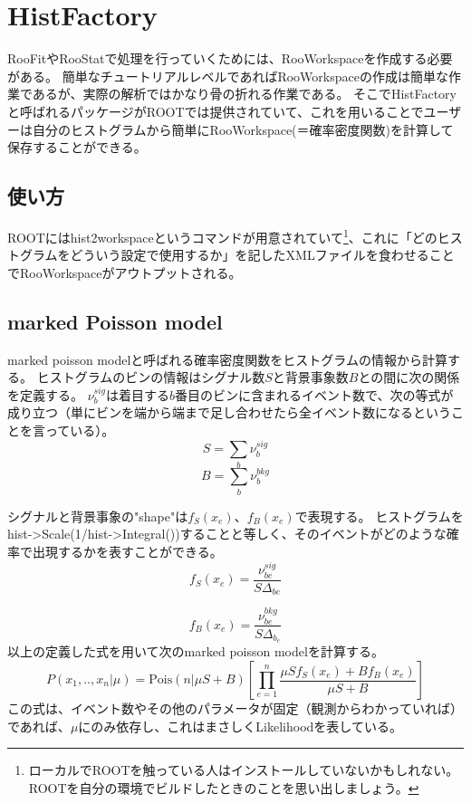 
\chapter{HistFactory}
RooFitやRooStatで処理を行っていくためには、RooWorkspaceを作成する必要がある。
簡単なチュートリアルレベルであればRooWorkspaceの作成は簡単な作業であるが、実際の解析ではかなり骨の折れる作業である。
そこでHistFactoryと呼ばれるパッケージがROOTでは提供されていて、これを用いることでユーザーは自分のヒストグラムから簡単にRooWorkspace(＝確率密度関数)を計算して保存することができる。

\section{使い方}
ROOTにはhist2workspaceというコマンドが用意されていて\footnote{ローカルでROOTを触っている人はインストールしていないかもしれない。ROOTを自分の環境でビルドしたときのことを思い出しましょう。}、これに「どのヒストグラムをどういう設定で使用するか」を記したXMLファイルを食わせることでRooWorkspaceがアウトプットされる。

\section{marked Poisson model}
marked poisson modelと呼ばれる確率密度関数をヒストグラムの情報から計算する。
ヒストグラムのビンの情報はシグナル数$S$と背景事象数$B$との間に次の関係を定義する。
$\nu_{b}^{sig}$は着目する$b$番目のビンに含まれるイベント数で、次の等式が成り立つ（単にビンを端から端まで足し合わせたら全イベント数になるということを言っている）。
\begin{equation}
  S = \sum_{b} \nu_{b}^{sig}
\end{equation}
\begin{equation}
  B = \sum_{b} \nu_{b}^{bkg}
\end{equation}

シグナルと背景事象の"shape"は$f_S(x_e)$、$f_B(x_e)$で表現する。
ヒストグラムをhist->Scale(1/hist->Integral())することと等しく、そのイベントがどのような確率で出現するかを表すことができる。
\begin{equation}
  f_S(x_e) = \frac{\nu_{be}^{sig}}{S\Delta_{be}}
\end{equation}

\begin{equation}
  f_B(x_e) = \frac{\nu_{be}^{bkg}}{S\Delta_{b_e}}
\end{equation}
以上の定義した式を用いて次のmarked poisson modelを計算する。
\begin{equation}
  P({x_1,..,x_n}|\mu) = \mathrm{Pois}(n|\mu S+B) \left[ \prod_{e=1}^{n}\frac{\mu Sf_S(x_e)+Bf_B(x_e)}{\mu S+B} \right]
\end{equation}
この式は、イベント数やその他のパラメータが固定（観測からわかっていれば）であれば、$\mu$にのみ依存し、これはまさしくLikelihoodを表している。

